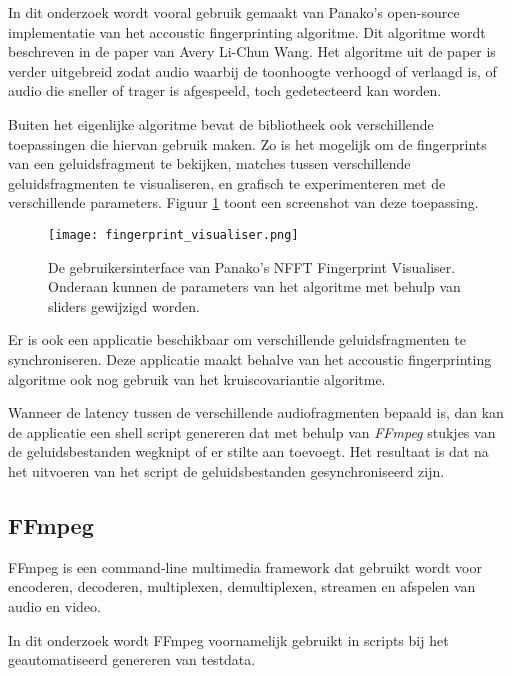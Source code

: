 In dit onderzoek wordt vooral gebruik gemaakt van Panako's open-source implementatie van het accoustic fingerprinting algoritme. Dit algoritme wordt beschreven in de paper van Avery Li-Chun Wang\cite{Wang2003a}. Het algoritme uit de paper is verder uitgebreid zodat audio waarbij de toonhoogte verhoogd of verlaagd is, of audio die sneller of trager is afgespeeld, toch gedetecteerd kan worden.

Buiten het eigenlijke algoritme bevat de bibliotheek ook verschillende toepassingen die hiervan gebruik maken. Zo is het mogelijk om de fingerprints van een geluidsfragment te bekijken, matches tussen verschillende geluidsfragmenten te visualiseren, en grafisch te experimenteren met de verschillende parameters. Figuur \ref{fingerprint_visualiser} toont een screenshot van deze toepassing.

\begin{figure}[!h]
	\captionsetup{width=0.8\textwidth}
	\caption[Gebruikersinterface van Audacity]{De gebruikersinterface van Panako's NFFT Fingerprint Visualiser. Onderaan kunnen de parameters van het algoritme met behulp van sliders gewijzigd worden.}
	\centering
	\advance\parskip0.3cm
	\texttt{[image: fingerprint\_visualiser.png]}
	\label{fingerprint_visualiser}
\end{figure}

Er is ook een applicatie beschikbaar om verschillende geluidsfragmenten te synchroniseren. Deze applicatie maakt behalve van het accoustic fingerprinting algoritme ook nog gebruik van het kruiscovariantie algoritme. 

Wanneer de latency tussen de verschillende audiofragmenten bepaald is, dan kan de applicatie een shell script genereren dat met behulp van \textit{FFmpeg} stukjes van de geluidsbestanden wegknipt of er stilte aan toevoegt. Het resultaat is dat na het uitvoeren van het script de geluidsbestanden gesynchroniseerd zijn.

\subsection{FFmpeg}

FFmpeg is een command-line multimedia framework dat gebruikt wordt voor encoderen, decoderen, multiplexen, demultiplexen, streamen en afspelen van audio en video. \cite{kollarconfiguration}

In dit onderzoek wordt FFmpeg voornamelijk gebruikt in scripts bij het geautomatiseerd genereren van testdata.

